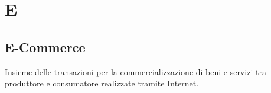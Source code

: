 \section*{E}
\markright{}
\subsection*{E-Commerce}
Insieme delle transazioni per la commercializzazione di beni e servizi tra produttore e consumatore realizzate tramite Internet.